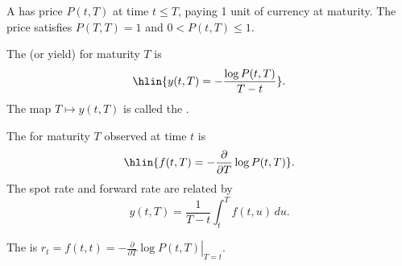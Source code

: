 \begin{definition} \label{definition:zero_coupon_bond_yield_curve_and_forward_rates}
A  has price $P(t, T)$ at time $t \leq T$, paying 1 unit of currency at maturity. The price satisfies $P(T, T) = 1$ and $0 < P(t, T) \leq 1$.

The  (or yield) for maturity $T$ is
$$\hlin{y(t, T) = -\frac{\log P(t, T)}{T - t}}.$$
The map $T \mapsto y(t, T)$ is called the .

The  for maturity $T$ observed at time $t$ is
$$\hlin{f(t, T) = -\frac{\partial}{\partial T} \log P(t, T)}.$$
The spot rate and forward rate are related by
$$y(t, T) = \frac{1}{T - t} \int_t^T f(t, u) \, du.$$

The  is $r_t = f(t, t) = -\left.\frac{\partial}{\partial T}\log P(t, T)\right|_{T=t}$.
\end{definition}